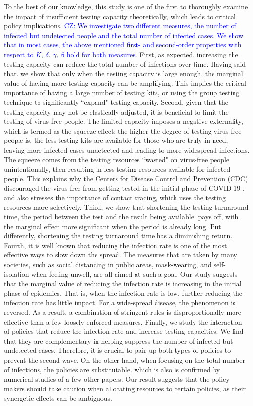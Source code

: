 \documentclass[nonblindrev, copyedit]{informs3a}
\newcommand\cz[1]{\textcolor{blue}{CZ: #1}}
\newcounter{prop}[chapter]
\begin{document}
To the best of our knowledge, this study is one of the first to thoroughly examine the impact of insufficient testing capacity theoretically, which leads to critical policy implications.
\cz{We investigate two different measures, the number of infected but undetected people and the total number of infected cases. 
We show that in most cases, the above mentioned first- and second-order properties with respect to $K$, $\delta$, $\gamma$, $\beta$ hold for both measures.}
First, as expected, increasing the testing capacity can reduce the total number of infections over time.
Having said that, we show that only when the testing capacity is large enough, the marginal value of having more testing capacity can be amplifying.
This implies the critical importance of having a large number of testing kits, or using the group testing technique to significantly ``expand" testing capacity.
Second, given that the testing capacity may not be elastically adjusted, it is beneficial to limit the testing of virus-free people.
The limited capacity imposes a negative externality, which is termed as the squeeze effect: the higher the degree of testing virus-free people is, the less testing kits are available for those who are truly in need, leaving more infected cases undetected and leading to more widespread infections. The squeeze comes from the testing resources ``wasted" on virus-free people unintentionally, then resulting in less testing resources available for infected people.
This explains why the Centers for Disease Control and Prevention (CDC) discouraged the virus-free from getting tested in the initial phase of COVID-19 \citep{overview}, and also stresses the importance of contact tracing, which uses the testing resources more selectively.
Third, we show that shortening the testing turnaround time, the period between the test and the result being available, pays off, with the marginal effect more significant when the period is already long. Put differently, shortening the testing turnaround time has a diminishing return.
Fourth, it is well known that reducing the infection rate is one of the most effective ways to slow down the spread.
The measures that are taken by many societies, such as social distancing in public areas, mask-wearing, and self-isolation when feeling unwell, are all aimed at such a goal.
Our study suggests that the marginal value of reducing the infection rate is increasing in the initial phase of epidemics.
That is, when the infection rate is low, further reducing the infection rate has little impact.
For a wide-spread disease, the phenomenon is reversed.
As a result, a combination of stringent rules is disproportionally more effective than a few loosely enforced measures.
Finally, we study the interaction of policies that reduce the infection rate and increase testing capacities.
We find that they are complementary in helping suppress the number of infected but undetected cases.
Therefore, it is crucial to pair up both types of policies to prevent the second wave.
On the other hand, when focusing on the total number of infections, the policies are substitutable.
which is also is confirmed by numerical studies of a few other papers.
Our result suggests that the policy makers should take caution when allocating resources to certain policies, as their synergetic effects can be ambiguous.
\end{document}
